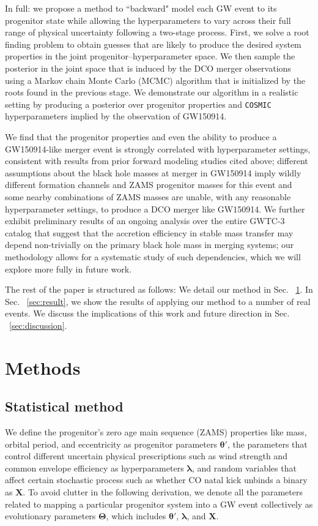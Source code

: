 \documentclass[linenumbers,twocolumn]{aastex631}
\begin{document}
In full: we propose a method to ``backward" model each GW event to its
progenitor state while allowing the hyperparameters to vary across their full
range of physical uncertainty following a two-stage process. First, we solve a
root finding problem to obtain guesses that are likely to produce the desired
system properties in the joint progenitor--hyperparameter space. We then sample
the posterior in the joint space that is induced by the DCO merger observations
using a Markov chain Monte Carlo (MCMC) algorithm that is initialized by the
roots found in the previous stage.  We demonstrate our algorithm in a realistic
setting by producing a posterior over progenitor properties and \texttt{COSMIC}
hyperparameters implied by the observation of GW150914.  

We find that the progenitor properties and even the ability to produce a
GW150914-like merger event is strongly correlated with hyperparameter settings,
consistent with results from prior forward modeling studies cited above;
different assumptions about the black hole masses at merger in GW150914 imply
wildly different formation channels and ZAMS progenitor masses for this event
and some nearby combinations of ZAMS masses are unable, with any reasonable
hyperparameter settings, to produce a DCO merger like GW150914.  We further
exhibit preliminary results of an ongoing analysis over the entire GWTC-3
catalog \citep{GWTC-3} that suggest that the accretion efficiency in stable mass
transfer may depend non-trivially on the primary black hole mass in merging
systems; our methodology allows for a systematic study of such dependencies,
which we will explore more fully in future work.

The rest of the paper is structured as follows: We detail our method in Sec.
~\ref{sec:method}. In Sec. ~\ref{sec:result}, we show the results of applying
our method to a number of real events. We discuss the implications of this work
and future direction in Sec. ~\ref{sec:discussion}.

\section{Methods}
\label{sec:method}

\subsection{\textbf{Statistical method}}
\label{subsec:stats}
We define the progenitor's zero age main sequence (ZAMS) properties like mass,
orbital period, and eccentricity as progenitor parameters $\bm{\theta'}$, the
parameters that control different uncertain physical prescriptions such as wind
strength and common envelope efficiency as hyperparameters $\bm{\lambda}$, and
random variables that affect certain stochastic process such as whether CO natal
kick unbinds a binary as $\bm{X}$. To avoid clutter in the following derivation,
we denote all the parameters related to mapping a particular progenitor system
into a GW event collectively as evolutionary parameters $\bm{\Theta}$, which
includes $\bm{\theta'}$, $\bm{\lambda}$, and $\bm{X}$.
\end{document}

